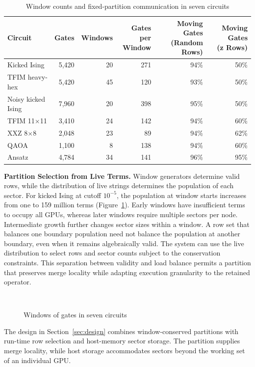 \begin{table}[t]
\caption{Window counts and fixed-partition communication in seven circuits}
\label{tab:windows}
\centering
\small
\begin{tabular}{@{}lrrrrr@{}}
\toprule
\textbf{Circuit} & \textbf{Gates} & \textbf{Windows} & \makecell[r]{\textbf{Gates per}\\\textbf{Window}} & \makecell[r]{\textbf{Moving Gates}\\\textbf{(Random Rows)}} & \makecell[r]{\textbf{Moving Gates}\\\textbf{(z Rows)}} \\
\midrule
Kicked Ising & 5,420 & 20 & 271 & 94\% & 50\% \\
TFIM heavy-hex & 5,420 & 45 & 120 & 93\% & 50\% \\
Noisy kicked Ising & 7,960 & 20 & 398 & 95\% & 50\% \\
TFIM 11$\times$11 & 3,410 & 24 & 142 & 94\% & 60\% \\
XXZ 8$\times$8 & 2,048 & 23 & 89 & 94\% & 62\% \\
QAOA & 1,100 & 8 & 138 & 94\% & 60\% \\
Ansatz & 4,784 & 34 & 141 & 96\% & 95\% \\
\bottomrule
\end{tabular}
\end{table}

\noindent\textbf{Partition Selection from Live Terms.}
Window generators determine valid rows, while the distribution of live strings determines the population of each sector.
For kicked Ising at cutoff $10^{-5}$, the population at window starts increases from one to 159 million terms (Figure~\ref{fig:windows}).
Early windows have insufficient terms to occupy all GPUs, whereas later windows require multiple sectors per node.
Intermediate growth further changes sector sizes within a window.
A row set that balances one boundary population need not balance the population at another boundary, even when it remains algebraically valid.
The system can use the live distribution to select rows and sector counts subject to the conservation constraints.
This separation between validity and load balance permits a partition that preserves merge locality while adapting execution granularity to the retained operator.

\begin{figure}[t]
\centering
{}\\[-2pt]
\hfill
{}
\caption{Windows of gates in seven circuits}
\label{fig:windows}
\end{figure}

The design in Section~\ref{sec:design} combines window-conserved partitions with run-time row selection and host-memory sector storage.
The partition supplies merge locality, while host storage accommodates sectors beyond the working set of an individual GPU.
